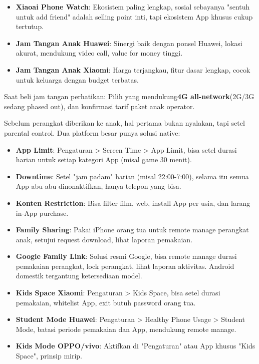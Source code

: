\begin{itemize}
  \item \textbf{Xiaoai Phone Watch}: Ekosistem paling lengkap, sosial sebayanya "sentuh untuk add friend" adalah selling point inti, tapi ekosistem App khusus cukup tertutup.
  \item \textbf{Jam Tangan Anak Huawei}: Sinergi baik dengan ponsel Huawei, lokasi akurat, mendukung video call, value for money tinggi.
  \item \textbf{Jam Tangan Anak Xiaomi}: Harga terjangkau, fitur dasar lengkap, cocok untuk keluarga dengan budget terbatas.
\end{itemize}

Saat beli jam tangan perhatikan: Pilih yang mendukung\textbf{4G all-network}(2G/3G sedang phased out), dan konfirmasi tarif paket anak operator.


Sebelum perangkat diberikan ke anak, hal pertama bukan nyalakan, tapi setel parental control. Dua platform besar punya solusi native:


\begin{itemize}
  \item \textbf{App Limit}: Pengaturan > Screen Time > App Limit, bisa setel durasi harian untuk setiap kategori App (misal game 30 menit).
  \item \textbf{Downtime}: Setel "jam padam" harian (misal 22:00-7:00), selama itu semua App abu-abu dinonaktifkan, hanya telepon yang bisa.
  \item \textbf{Konten Restriction}: Bisa filter film, web, install App per usia, dan larang in-App purchase.
  \item \textbf{Family Sharing}: Pakai iPhone orang tua untuk remote manage perangkat anak, setujui request download, lihat laporan pemakaian.
\end{itemize}


\begin{itemize}
  \item \textbf{Google Family Link}: Solusi resmi Google, bisa remote manage durasi pemakaian perangkat, lock perangkat, lihat laporan aktivitas. Android domestik tergantung ketersediaan model.
  \item \textbf{Kids Space Xiaomi}: Pengaturan > Kids Space, bisa setel durasi pemakaian, whitelist App, exit butuh password orang tua.
  \item \textbf{Student Mode Huawei}: Pengaturan > Healthy Phone Usage > Student Mode, batasi periode pemakaian dan App, mendukung remote manage.
  \item \textbf{Kids Mode OPPO/vivo}: Aktifkan di "Pengaturan" atau App khusus "Kids Space", prinsip mirip.
\end{itemize}


